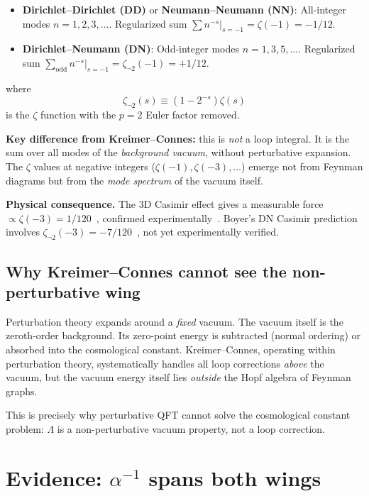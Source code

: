 \documentclass[11pt,a4paper]{article}
\begin{document}
\begin{itemize}
\item \textbf{Dirichlet--Dirichlet (DD)} or
\textbf{Neumann--Neumann (NN)}:
All-integer modes $n = 1, 2, 3, \ldots$. Regularized sum
$\sum n^{-s}|_{s=-1} = \zeta(-1) = -1/12$.

\item \textbf{Dirichlet--Neumann (DN)}:
Odd-integer modes $n = 1, 3, 5, \ldots$. Regularized sum
$\sum_{\text{odd}} n^{-s}|_{s=-1} = \zeta_{\neg 2}(-1) = +1/12$.
\end{itemize}

where
\begin{equation}
\zeta_{\neg 2}(s) \equiv (1 - 2^{-s})\zeta(s)
\end{equation}
is the $\zeta$ function with the $p = 2$ Euler factor removed.

\textbf{Key difference from Kreimer--Connes:} this is
\emph{not} a loop integral. It is the sum over all modes of the
\emph{background vacuum}, without perturbative expansion. The
$\zeta$ values at negative integers ($\zeta(-1), \zeta(-3), \ldots$)
emerge not from Feynman diagrams but from the
\emph{mode spectrum} of the vacuum itself.

\textbf{Physical consequence.} The 3D Casimir effect gives a
measurable force $\propto \zeta(-3) = 1/120$~\cite{Casimir1948},
confirmed experimentally~\cite{Lamoreaux1997}. Boyer's DN Casimir
prediction involves $\zeta_{\neg 2}(-3) = -7/120$~\cite{Boyer1974},
not yet experimentally verified.

\subsection{Why Kreimer--Connes cannot see the non-perturbative wing}

Perturbation theory expands around a \emph{fixed} vacuum. The
vacuum itself is the zeroth-order background. Its zero-point
energy is subtracted (normal ordering) or absorbed into the
cosmological constant. Kreimer--Connes, operating within
perturbation theory, systematically handles all loop corrections
\emph{above} the vacuum, but the vacuum energy itself lies
\emph{outside} the Hopf algebra of Feynman graphs.

This is precisely why perturbative QFT cannot solve the
cosmological constant problem: $\Lambda$ is a non-perturbative
vacuum property, not a loop correction.

\section{Evidence: $\alpha^{-1}$ spans both wings}
\end{document}

